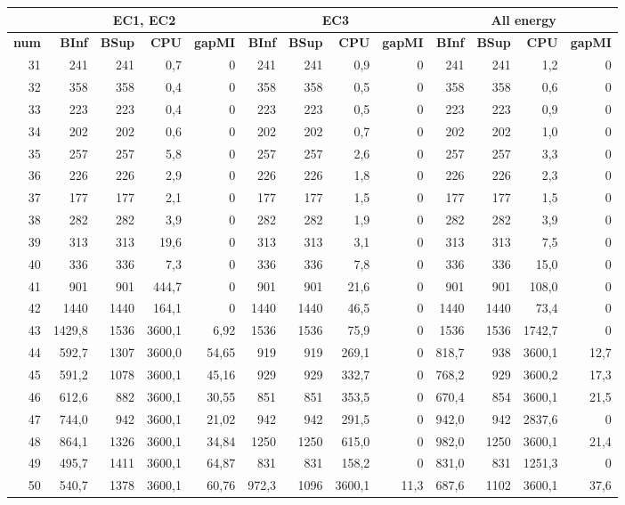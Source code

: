 {%
\begin{table}[H]
	\centering
	\small
	\begin{tabular}{|r|rrrr|rrrr|rrrr|}
		\hline
		\toprule
		\rowcolor{cyan}	&\multicolumn{4}{c|}{\textbf{ EC1, EC2}}     & \multicolumn{4}{c|}{\textbf{ EC3}} & \multicolumn{4}{c|}{\textbf{ All energy}} \\\hline
		\midrule
		\rowcolor{cyan}	\textbf{num} & \textbf{BInf} & \textbf{BSup}  & \textbf{CPU} & \textbf{gapMI} &  \textbf{BInf} & \textbf{BSup}  &\textbf{CPU} & \textbf{gapMI} &  \textbf{BInf} & \textbf{BSup}  &\textbf{CPU} & \textbf{gapMI} \\\hline
		\midrule
		
31	&	241	&	241	&	0,7	&	0	&	241	&	241	&	0,9	&	0	&	241	&	241	&	1,2	&	0	\\ \hline
32	&	358	&	358	&	0,4	&	0	&	358	&	358	&	0,5	&	0	&	358	&	358	&	0,6	&	0	\\ \hline
33	&	223	&	223	&	0,4	&	0	&	223	&	223	&	0,5	&	0	&	223	&	223	&	0,9	&	0	\\ \hline
34	&	202	&	202	&	0,6	&	0	&	202	&	202	&	0,7	&	0	&	202	&	202	&	1,0	&	0	\\ \hline
35	&	257	&	257	&	5,8	&	0	&	257	&	257	&	2,6	&	0	&	257	&	257	&	3,3	&	0	\\ \hline
36	&	226	&	226	&	2,9	&	0	&	226	&	226	&	1,8	&	0	&	226	&	226	&	2,3	&	0	\\ \hline
37	&	177	&	177	&	2,1	&	0	&	177	&	177	&	1,5	&	0	&	177	&	177	&	1,5	&	0	\\ \hline
38	&	282	&	282	&	3,9	&	0	&	282	&	282	&	1,9	&	0	&	282	&	282	&	3,9	&	0	\\ \hline
39	&	313	&	313	&	19,6	&	0	&	313	&	313	&	3,1	&	0	&	313	&	313	&	7,5	&	0	\\ \hline
40	&	336	&	336	&	7,3	&	0	&	336	&	336	&	7,8	&	0	&	336	&	336	&	15,0	&	0	\\ \hline
41	&	901	&	901	&	444,7	&	0	&	901	&	901	&	21,6	&	0	&	901	&	901	&	108,0	&	0	\\ \hline
42	&	1440	&	1440	&	164,1	&	0	&	1440	&	1440	&	46,5	&	0	&	1440	&	1440	&	73,4	&	0	\\ \hline
43	&	1429,8	&	1536	&	3600,1	&	6,92	&	1536	&	1536	&	75,9	&	0	&	1536	&	1536	&	1742,7	&	0	\\ \hline
44	&	592,7	&	1307	&	3600,0	&	54,65	&	919	&	919	&	269,1	&	0	&	818,7	&	938	&	3600,1	&	12,7	\\ \hline
45	&	591,2	&	1078	&	3600,1	&	45,16	&	929	&	929	&	332,7	&	0	&	768,2	&	929	&	3600,2	&	17,3	\\ \hline
46	&	612,6	&	882	&	3600,1	&	30,55	&	851	&	851	&	353,5	&	0	&	670,4	&	854	&	3600,1	&	21,5	\\ \hline
47	&	744,0	&	942	&	3600,1	&	21,02	&	942	&	942	&	291,5	&	0	&	942,0	&	942	&	2837,6	&	0	\\ \hline
48	&	864,1	&	1326	&	3600,1	&	34,84	&	1250	&	1250	&	615,0	&	0	&	982,0	&	1250	&	3600,1	&	21,4	\\ \hline
49	&	495,7	&	1411	&	3600,1	&	64,87	&	831	&	831	&	158,2	&	0	&	831,0	&	831	&	1251,3	&	0	\\ \hline
50	&	540,7	&	1378	&	3600,1	&	60,76	&	972,3	&	1096	&	3600,1	&	11,3	&	687,6	&	1102	&	3600,1	&	37,6	\\ \hline


\end{tabular}
\end{table}}
